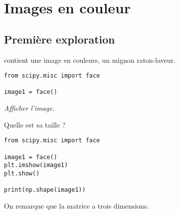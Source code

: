 




\section{Images en couleur}
\subsection{Première exploration}
 contient une image en couleurs, un mignon raton-laveur.
\begin{lstlisting}
from scipy.misc import face

image1 = face()
\end{lstlisting}
\begin{Exercise}\it Afficher l'image.

Quelle est sa taille ?
\end{Exercise}
\begin{Answer}
\begin{lstlisting}
from scipy.misc import face

image1 = face()
plt.imshow(image1)
plt.show()

print(np.shape(image1))
\end{lstlisting}

\end{Answer}
On remarque que la matrice a trois dimensions.  

